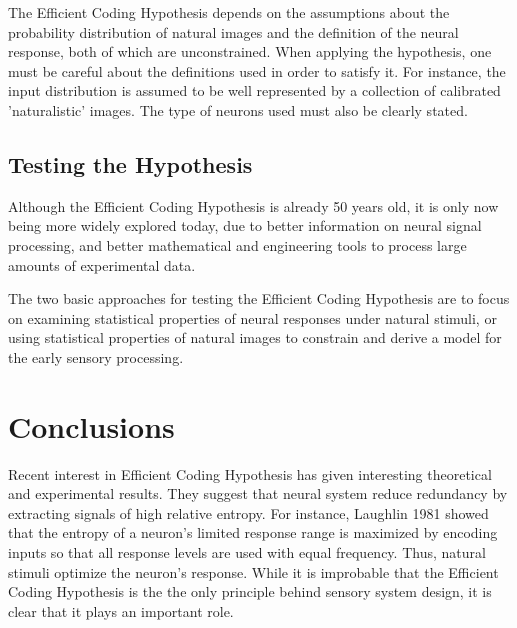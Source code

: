 \documentclass[twoside]{article}
\begin{document}
\begin{multicols}{2}
The Efficient Coding Hypothesis depends on the assumptions about the probability distribution of natural images and the definition of the neural response, both of which are unconstrained. When applying the hypothesis, one must be careful about the definitions used in order to satisfy it. For instance, the input distribution is assumed to be well represented by a collection of calibrated 'naturalistic' images. The type of neurons used must also be clearly stated.

\subsection{Testing the Hypothesis}

Although the Efficient Coding Hypothesis is already 50 years old, it is only now being more widely explored today, due to better information on neural signal processing, and better mathematical and engineering tools to process large amounts of experimental data.

The two basic approaches for testing the Efficient Coding Hypothesis are to focus on examining statistical properties of neural responses under natural stimuli, or using statistical properties of natural images to constrain and derive a model for the early sensory processing.





\section{Conclusions}

Recent interest in Efficient Coding Hypothesis has given interesting theoretical and experimental results. They suggest that neural system reduce redundancy by extracting signals of high relative entropy. For instance, Laughlin 1981 showed that the entropy of a neuron’s limited response range is maximized by encoding inputs so that all response levels are used with equal frequency. Thus, natural stimuli optimize the neuron's response. While it is improbable that the Efficient Coding Hypothesis is the the only principle behind sensory system design, it is clear that it plays an important role.




\end{multicols}
\end{document}
